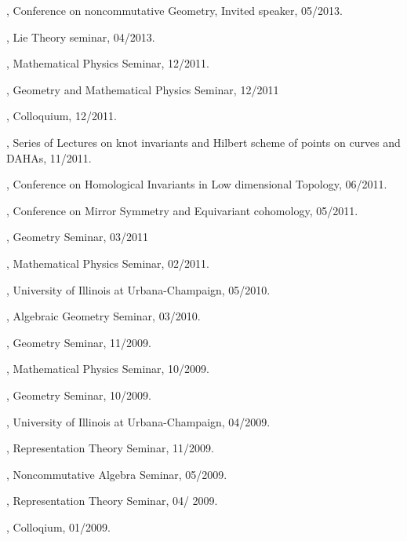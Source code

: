 \documentclass[11pt]{amsart}
\theoremstyle{plain}
\theoremstyle{definition}
\theoremstyle{remark}
\begin{document}
, {Conference on noncommutative Geometry}, Invited speaker, 05/2013.

, Lie Theory seminar, 04/2013.

, Mathematical Physics Seminar, 12/2011.

, Geometry and Mathematical Physics Seminar, 12/2011

, Colloquium, 12/2011.

, Series of Lectures on knot invariants and Hilbert scheme of points
on curves and DAHAs, 11/2011.

, Conference on Homological Invariants in Low dimensional 
Topology, 06/2011.

, Conference on Mirror Symmetry and Equivariant 
cohomology, 05/2011.

, Geometry Seminar, 03/2011

, Mathematical Physics Seminar, 02/2011.


,
University of Illinois at Urbana-Champaign,
05/2010.

, Algebraic Geometry Seminar,
03/2010.

, Geometry Seminar, 11/2009.

, Mathematical Physics Seminar,
10/2009.

, Geometry Seminar, 10/2009.

, University of Illinois at Urbana-Champaign,
04/2009.


, Representation Theory Seminar, 11/2009.

, Noncommutative Algebra Seminar, 05/2009.

, Representation Theory Seminar, 04/ 2009.



, Colloqium, 01/2009.
\end{document}
